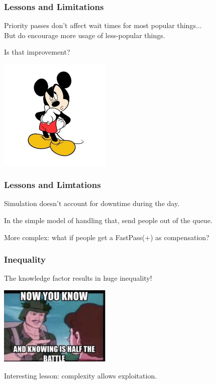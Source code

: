 \begin{frame}
\frametitle{Lessons and Limitations}

Priority passes don't affect wait times for most popular things...\\
\quad But do encourage more usage of less-popular things.

Is that improvement?

\begin{center}
	\includegraphics[width=0.4\textwidth]{images/mickey-think.jpg}
\end{center}


\end{frame}


\begin{frame}
\frametitle{Lessons and Limtations}
Simulation doesn't account for downtime during the day.

In the simple model of handling that, send people out of the queue.

More complex: what if people get a FastPass(+) as compensation?


\end{frame}


\begin{frame}
\frametitle{Inequality}

The knowledge factor results in huge inequality!

\begin{center}
	\includegraphics[width=0.4\textwidth]{images/halfthebattle.jpg}
\end{center}

Interesting lesson: complexity allows exploitation.

\end{frame}







